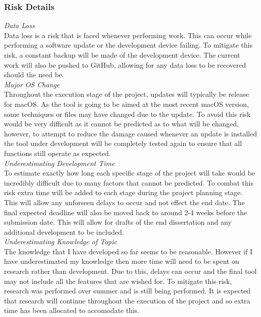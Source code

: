 \documentclass[11pt,a4paper]{article}
\newcommand\tab[1][0.5cm]{\hspace*{#1}}
\begin{document}
\subsubsection{Risk Details}

\tab\textit{Data Loss}\\
Data loss is a risk that is faced whenever performing work. This can occur while performing a software update or the development device failing. To mitigate this risk, a constant backup will be made of the development device. The current work will also be pushed to GitHub, allowing for any data loss to be recovered should the need be.\\

\textit{Major OS Change}\\
Throughout the execution stage of the project, updates will typically be release for macOS. As the tool is going to be aimed at the most recent macOS version, some techniques or files may have changed due to the update. To avoid this risk would be very difficult as it cannot be predicted as to what will be changed, however, to attempt to reduce the damage caused whenever an update is installed the tool under development will be completely tested again to ensure that all functions still operate as expected.\\

\textit{Underestimating Development Time}\\
To estimate exactly how long each specific stage of the project will take would be incredibly difficult due to many factors that cannot be predicted. To combat this risk extra time will be added to each stage during the project planning stage. This will allow any unforseen delays to occur and not effect the end date. The final expected deadline will also be moved back to around 2-4 weeks before the submission date. This will allow for drafts of the end dissertation and any additional development to be included.\\

\textit{Underestimating Knowledge of Topic}\\
The knowledge that I have developed so far seems to be reasonable. However if I have underestimated my knowledge then more time will need to be spent on research rather than development. Due to this, delays can occur and the final tool may not include all the features that are wished for. To mitigate this risk, research was performed over summer and is still being performed. It is expected that research will continue throughout the execution of the project and so extra time has been allocated to accomodate this.\\
\end{document}
